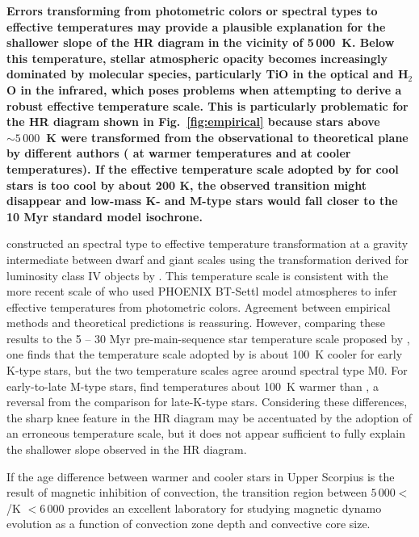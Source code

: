 \documentclass{aa}
\begin{document}
{\bf Errors transforming from photometric colors or spectral types to effective temperatures may provide a plausible explanation for the shallower slope of the HR diagram in the vicinity of 5\,000~K. Below this temperature, stellar atmospheric opacity becomes increasingly dominated by molecular species, particularly TiO in the optical and H$_2$O in the infrared, which poses problems when attempting to derive a robust effective temperature scale. This is particularly problematic for the HR diagram shown in Fig.~\ref{fig:empirical} because stars above \teff$ \sim 5\,000$~K were transformed from the observational to theoretical plane by different authors (\citealt{Pecaut2012} at warmer temperatures and \citealt{Preibisch1999} at cooler temperatures). If the effective temperature scale adopted by \citet{Preibisch1999} for cool stars is too cool by about 200 K, the observed transition might disappear and low-mass K- and M-type stars would fall closer to the 10 Myr standard model isochrone.

\citet{Preibisch1999} constructed an spectral type to effective temperature transformation at a gravity intermediate between dwarf and giant scales using the transformation derived for luminosity class IV objects by \citet{deJager1987}. This temperature scale is consistent with the more recent scale of \citet{Herczeg2015} who used PHOENIX BT-Settl model atmospheres \citep{Allard2011} to infer effective temperatures from photometric colors. Agreement between empirical methods and theoretical predictions is reassuring. However,
comparing these results to the 5 -- 30 Myr pre-main-sequence star temperature scale proposed by \citet{Pecaut2013}, one finds that the temperature scale adopted by \citeauthor{Preibisch1999} is about 100~K cooler for early K-type stars, but the two temperature scales agree around spectral type M0. For early-to-late M-type stars, \citeauthor{Preibisch1999} find temperatures about 100~K warmer than \citet{Pecaut2013}, a reversal from the comparison for late-K-type stars. Considering these differences, the sharp knee feature in the HR diagram may be accentuated by the adoption of an erroneous temperature scale, but it does not appear sufficient to fully explain the shallower slope observed in the HR diagram.
} 

If the age difference between warmer and cooler stars in Upper Scorpius is the result of magnetic inhibition of convection, the transition region between $5\,000 <$ \teff/K $< 6\,000$ provides an excellent laboratory for studying magnetic dynamo evolution as a function of convection zone depth and convective core size.
\end{document}
